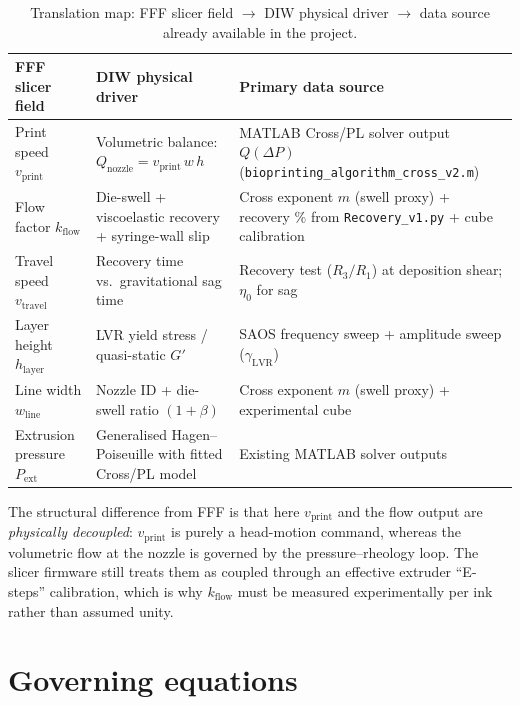 \documentclass[11pt,a4paper]{article}
\begin{document}
\begin{table}[h]
\centering
\small
\caption{Translation map: FFF slicer field $\rightarrow$ DIW physical driver
$\rightarrow$ data source already available in the project.}
\label{tab:translation}
\begin{tabular}{p{3.0cm} p{5.0cm} p{6.8cm}}
\toprule
\textbf{FFF slicer field} & \textbf{DIW physical driver} & \textbf{Primary data source} \\
\midrule
Print speed $v_\mathrm{print}$ & Volumetric balance:\newline $Q_\mathrm{nozzle}=v_\mathrm{print}\,w\,h$ & MATLAB Cross/PL solver output $Q(\Delta P)$ (\texttt{bioprinting\_algorithm\_cross\_v2.m}) \\
Flow factor $k_\mathrm{flow}$ & Die-swell + viscoelastic recovery + syringe-wall slip & Cross exponent $m$ (swell proxy) + recovery $\%$ from \texttt{Recovery\_v1.py} + cube calibration \\
Travel speed $v_\mathrm{travel}$ & Recovery time vs.\ gravitational sag time & Recovery test ($R_3/R_1$) at deposition shear; $\eta_0$ for sag \\
Layer height $h_\mathrm{layer}$ & LVR yield stress / quasi-static $G'$ & SAOS frequency sweep + amplitude sweep ($\gamma_\mathrm{LVR}$) \\
Line width $w_\mathrm{line}$ & Nozzle ID + die-swell ratio $(1+\beta)$ & Cross exponent $m$ (swell proxy) + experimental cube \\
Extrusion pressure $P_\mathrm{ext}$ & Generalised Hagen--Poiseuille with fitted Cross/PL model & Existing MATLAB solver outputs \\
\bottomrule
\end{tabular}
\end{table}

The structural difference from FFF is that here $v_\mathrm{print}$ and the flow
output are \emph{physically decoupled}: $v_\mathrm{print}$ is purely a head-motion
command, whereas the volumetric flow at the nozzle is governed by the
pressure--rheology loop. The slicer firmware still treats them as coupled through
an effective extruder ``E-steps'' calibration, which is why $k_\mathrm{flow}$ must
be measured experimentally per ink rather than assumed unity.

\section{Governing equations}
\label{sec:equations}
\end{document}

